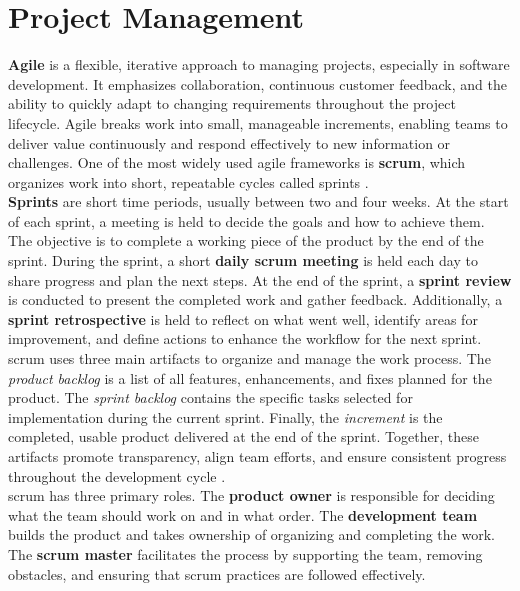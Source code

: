 \section{Project Management}
\label{sec:project-management}

\textbf{Agile} is a flexible, iterative approach to managing projects, especially in software development. It emphasizes collaboration, continuous customer feedback, and the ability to quickly adapt to changing requirements throughout the project lifecycle. Agile breaks work into small, manageable increments, enabling teams to deliver value continuously and respond effectively to new information or challenges. One of the most widely used agile frameworks is \textbf{\gls{scrum}}, which organizes work into short, repeatable cycles called sprints \cite{scrumguides:scrum}. \\

\textbf{Sprints} are short time periods, usually between two and four weeks. At the start of each sprint, a meeting is held to decide the goals and how to achieve them. The objective is to complete a working piece of the product by the end of the sprint. During the sprint, a short \textbf{daily \gls{scrum} meeting} is held each day to share progress and plan the next steps. At the end of the sprint, a \textbf{sprint review} is conducted to present the completed work and gather feedback. Additionally, a \textbf{sprint retrospective} is held to reflect on what went well, identify areas for improvement, and define actions to enhance the workflow for the next sprint. \\

\gls{scrum} uses three main artifacts to organize and manage the work process. The \textit{product backlog} is a list of all features, enhancements, and fixes planned for the product. The \textit{sprint backlog} contains the specific tasks selected for implementation during the current sprint. Finally, the \textit{increment} is the completed, usable product delivered at the end of the sprint. Together, these artifacts promote transparency, align team efforts, and ensure consistent progress throughout the development cycle \cite{scrumguides:scrum}. \\

\gls{scrum} has three primary roles. The \textbf{product owner} is responsible for deciding what the team should work on and in what order. The \textbf{development team} builds the product and takes ownership of organizing and completing the work. The \textbf{\gls{scrum} master} facilitates the process by supporting the team, removing obstacles, and ensuring that \gls{scrum} practices are followed effectively.\\

